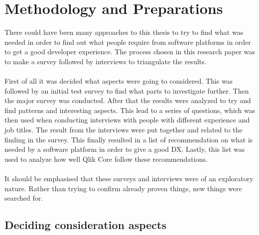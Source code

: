\documentclass{cslthse-msc}
\begin{document}
    \chapter{Methodology and Preparations}

    There could have been many approaches to this thesis to try to find what was needed in order to find out
    what people require from software platforms in order to get a good developer experience. The process chosen in this research paper was to make
    a survey followed by interviews to triangulate the results.
    \\ \\
    First of all it was decided what aspects were going to considered. This was followed by an initial test survey to find what
    parts to investigate further. Then the major survey was conducted. After that the results were analyzed to try and find
    patterns and interesting aspects. This lead to a series of questions, which was then used when conducting interviews with people with
    different experience and job titles. The result from the interviews were put together and related to the finding in the survey.
    This finally resulted in a list of recommendation on what is needed by a software platform in order to give a good DX.
    Lastly, this list was used to analyze how well Qlik Core follow these recommendations.\\ \\
    It should be emphasised that these surveys and interviews were of an exploratory nature. Rather than trying to confirm already proven things, new things were searched for.
    \section{Deciding consideration aspects}
\end{document}
